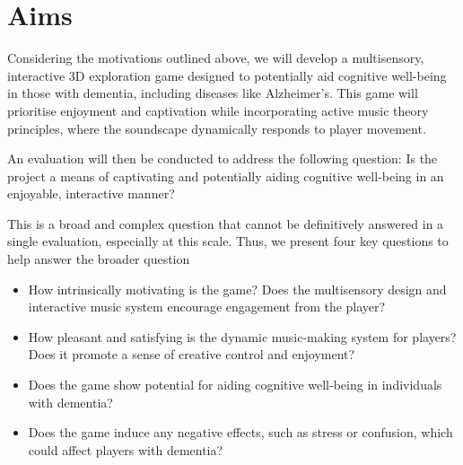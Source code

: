 \documentclass{l4proj}
\begin{document}
\section{Aims}
Considering the motivations outlined above, we will develop a multisensory, interactive 3D exploration game designed to potentially aid cognitive well-being in those with dementia, including diseases like Alzheimer's. This game will prioritise enjoyment and captivation while incorporating active music theory principles, where the soundscape dynamically responds to player movement.

An evaluation will then be conducted to address the following question:
Is the project a means of captivating and potentially aiding cognitive well-being in an enjoyable, interactive manner?

This is a broad and complex question that cannot be definitively answered in a single evaluation, especially at this scale. Thus, we present four key questions to help answer the broader question

\begin{itemize}
    \item How intrinsically motivating is the game? Does the multisensory design and interactive music system encourage engagement from the player?
    \item How pleasant and satisfying is the dynamic music-making system for players? Does it promote a sense of creative control and enjoyment?
    \item Does the game show potential for aiding cognitive well-being in individuals with dementia?
    \item Does the game induce any negative effects, such as stress or confusion, which could affect players with dementia?
\end{itemize}



\end{document}

